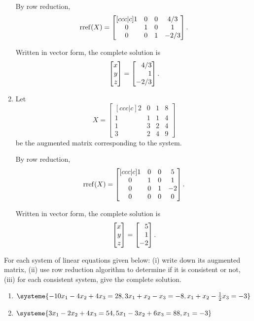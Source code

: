 \begin{exercises}
\begin{problist}
\begin{solution}
\begin{enumerate}
				By row reduction,
				\[
					\operatorname{rref}(X)=
					\begin{bmatrix}[ccc|c]
						1 & 0 & 0 & 4/3\\
						0 & 1 & 0 & 1\\
						0 & 0 & 1 & -2/3
					\end{bmatrix}.
				\]
				
				Written in vector form, the complete solution is
				\[
					\mat{x\\y\\z} = \mat{4/3\\1\\-2/3}.
				\]
				\item 
				Let
				\[
					X=
					\begin{bmatrix}[ccc|c]
						2 & 0 & 1 & 8\\
						1 & 1 & 1 & 4\\
						1 & 3 & 2 & 4\\
						3 & 2 & 4 & 9
					\end{bmatrix}
				\]
				be the augmented matrix corresponding to the system.
				
				By row reduction,
				\[
					\operatorname{rref}(X)=
					\begin{bmatrix}[ccc|c]
						1 & 0 & 0 & 5\\
						0 & 1 & 0 & 1\\
						0 & 0 & 1 & -2\\
						0 & 0 & 0 & 0
					\end{bmatrix}.
				\]
				
				Written in vector form, the complete solution is
				\[
					\mat{x\\y\\z} = \mat{5\\1\\-2}.
				\]
			\end{enumerate}
		\end{solution}

		\prob For each system of linear equations given below: (i) write down
		its augmented matrix, (ii) use row reduction algorithm to determine if it
		is consistent or not, (iii) for each consistent system, give the complete
		solution.
		\begin{enumerate}
			\item $\systeme{-10x_1-4x_2+4x_3=28, 3x_1+x_2-x_3=-8, x_1+x_2-\frac{1}{2}x_3=-3}$

			\item $\systeme{3x_1-2x_2+4x_3=54, 5x_1-3x_2+6x_3=88, x_1=-3}$


\end{enumerate}
\end{problist}
\end{exercises}

